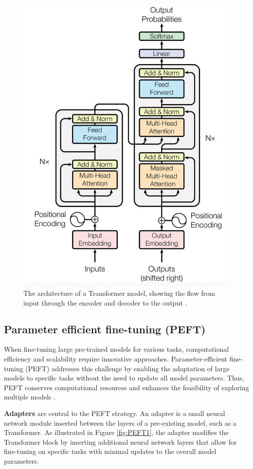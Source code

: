 \documentclass[conference]{IEEEtran}
\begin{document}
\begin{figure}[!h]
    \centering
    \includegraphics[width=.85\linewidth]{pictures/transformer_architecture.png}
    \caption{The architecture of a Transformer model, showing the flow from input through the encoder and decoder to the output \cite{Vaswani2023}.}
    \label{fig:transformer_architecture}
\end{figure}

\subsection{Parameter efficient fine-tuning (PEFT)}%
When fine-tuning large pre-trained models for various tasks, computational efficiency and scalability require innovative approaches. Parameter-efficient fine-tuning (PEFT) addresses this challenge by enabling the adaptation of large models to specific tasks without the need to update all model parameters. Thus, PEFT conserves computational resources and enhances the feasibility of exploring multiple models \cite{pfeiffer2020adapterhub}.

\textbf{Adapters} are central to the PEFT strategy. An adapter is a small neural network module inserted between the layers of a pre-existing model, such as a Transformer. As illustrated in Figure \ref{fig:PEFT1}, the adapter modifies the Transformer block by inserting additional neural network layers that allow for fine-tuning on specific tasks with minimal updates to the overall model parameters.
\end{document}

